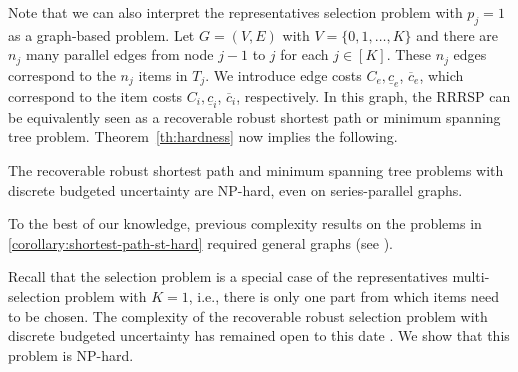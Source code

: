 Note that we can also interpret the representatives selection problem with $p_j=1$ as a graph-based problem. Let $G=(V,E)$ with $V=\{0,1,\ldots,K\}$ and there are $n_j$ many parallel edges from node $j-1$ to $j$ for each $j\in[K]$. These $n_j$ edges correspond to the $n_j$ items in $T_j$. We introduce edge costs $C_e, \underline{c}_e$, $\overline{c}_e$, which correspond to the item costs $C_i, \underline{c}_i$, $\overline{c}_i$, respectively. In this graph, the RRRSP can be equivalently seen as a recoverable robust shortest path or minimum spanning tree problem. Theorem~\ref{th:hardness} now implies the following.

\begin{corollary}
\label{corollary:shortest-path-st-hard}
The recoverable robust shortest path and minimum spanning tree problems with discrete budgeted uncertainty are NP-hard, even on series-parallel graphs.
\end{corollary}

To the best of our knowledge, previous complexity results on the problems in \cref{corollary:shortest-path-st-hard} required general graphs (see \cite{busing2012paths,nasrabadi2013robust}).

Recall that the selection problem is a special case of the representatives multi-selection problem with $K=1$, i.e., there is only one part from which items need to be chosen. The complexity of the recoverable robust selection problem with discrete budgeted uncertainty has remained open to this date \cite{chassein2018recoverable}. We show that this problem is NP-hard.


